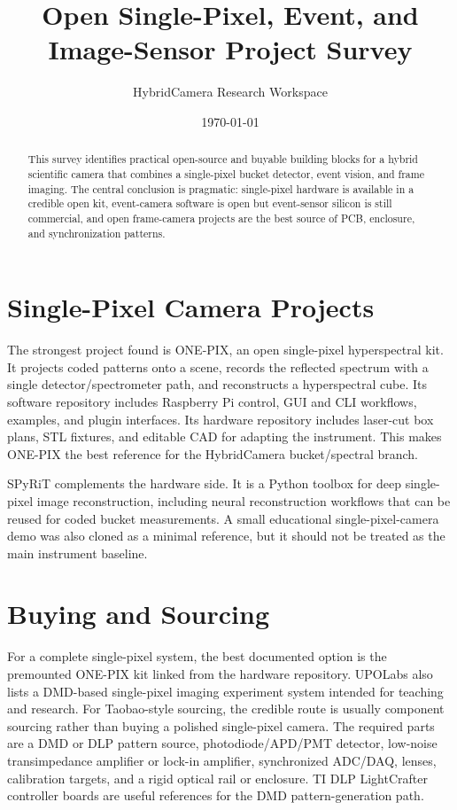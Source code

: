 \documentclass[11pt]{article}
\title{Open Single-Pixel, Event, and Image-Sensor Project Survey}
\author{HybridCamera Research Workspace}
\date{\today}
\begin{document}
\maketitle

\begin{abstract}
This survey identifies practical open-source and buyable building blocks for a
hybrid scientific camera that combines a single-pixel bucket detector, event
vision, and frame imaging. The central conclusion is pragmatic: single-pixel
hardware is available in a credible open kit, event-camera software is open but
event-sensor silicon is still commercial, and open frame-camera projects are the
best source of PCB, enclosure, and synchronization patterns.
\end{abstract}

\section{Single-Pixel Camera Projects}

The strongest project found is ONE-PIX, an open single-pixel hyperspectral kit.
It projects coded patterns onto a scene, records the reflected spectrum with a
single detector/spectrometer path, and reconstructs a hyperspectral cube. Its
software repository includes Raspberry Pi control, GUI and CLI workflows,
examples, and plugin interfaces. Its hardware repository includes laser-cut box
plans, STL fixtures, and editable CAD for adapting the instrument. This makes
ONE-PIX the best reference for the HybridCamera bucket/spectral branch.

SPyRiT complements the hardware side. It is a Python toolbox for deep
single-pixel image reconstruction, including neural reconstruction workflows
that can be reused for coded bucket measurements. A small educational
single-pixel-camera demo was also cloned as a minimal reference, but it should
not be treated as the main instrument baseline.

\section{Buying and Sourcing}

For a complete single-pixel system, the best documented option is the premounted
ONE-PIX kit linked from the hardware repository. UPOLabs also lists a DMD-based
single-pixel imaging experiment system intended for teaching and research. For
Taobao-style sourcing, the credible route is usually component sourcing rather
than buying a polished single-pixel camera. The required parts are a DMD or DLP
pattern source, photodiode/APD/PMT detector, low-noise transimpedance amplifier
or lock-in amplifier, synchronized ADC/DAQ, lenses, calibration targets, and a
rigid optical rail or enclosure. TI DLP LightCrafter controller boards are useful
references for the DMD pattern-generation path.
\end{document}
